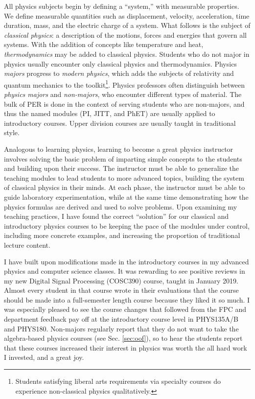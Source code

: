 \documentclass[../../main.tex]{subfiles}
\begin{document}
All physics subjects begin by defining a ``system,'' with measurable properties.  We define measurable quantities such as displacement, velocity, acceleration, time duration, mass, and the electric charge of a system.  What follows is the subject of \textit{classical physics}: a description of the motions, forces and energies that govern all systems.  With the addition of concepts like temperature and heat, \textit{thermodynamics} may be added to classical physics.  Students who do not major in physics usually encounter only classical physics and thermodynamics.  Physics \textit{majors} progress to \textit{modern physics}, which adds the subjects of relativity and quantum mechanics to the toolkit\footnote{Students satisfying liberal arts requirements via specialty courses do experience non-classical physics qualitatively.}.  Physics professors often distinguish between \textit{physics majors} and \textit{non-majors}, who encounter different types of material.  The bulk of PER is done in the context of serving students who are non-majors, and thus the named modules (PI, JITT, and PhET) are usually applied to introductory courses.  Upper division courses are usually taught in traditional style.  \\ \hspace{0.1cm}

Analogous to learning physics, learning to become a great physics instructor involves solving the basic problem of imparting simple concepts to the students and building upon their success.  The instructor must be able to generalize the teaching modules to lead students to more advanced topics, building the system of classical physics in their minds.  At each phase, the instructor must be able to guide laboratory experimentation, while at the same time demonstrating how the physics formulas are derived and used to solve problems.  Upon examining my teaching practices, I have found the correct ``solution'' for our classical and introductory physics courses to be keeping the pace of the modules under control, including more concrete examples, and increasing the proportion of traditional lecture content.  \\ \hspace{0.1cm}

I have built upon modifications made in the introductory courses in my advanced physics and computer science classes.  It was rewarding to see positive reviews in my new Digital Signal Processing (COSC390) course, taught in January 2019.  Almost every student in that course wrote in their evaluations that the course should be made into a full-semester length course because they liked it so much.  I was especially pleased to see the course changes that followed from the FPC and department feedback pay off at the introductory course level in PHYS135A/B and PHYS180.  Non-majors regularly report that they do not want to take the algebra-based physics courses (see Sec. \ref{sec:oof}), so to hear the students report that these courses increased their interest in physics was worth the all hard work I invested, and a great joy.
\end{document}
